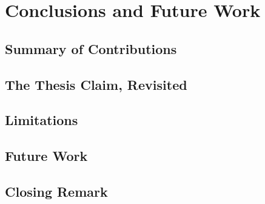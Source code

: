 \chapter{Conclusions and Future Work}
\label{ch:conclusion}

\section{Summary of Contributions}
\label{sec:conc-summary}

\section{The Thesis Claim, Revisited}
\label{sec:conc-claim}

\section{Limitations}
\label{sec:conc-limitations}

\section{Future Work}
\label{sec:conc-future}

\section{Closing Remark}
\label{sec:conc-closing}
